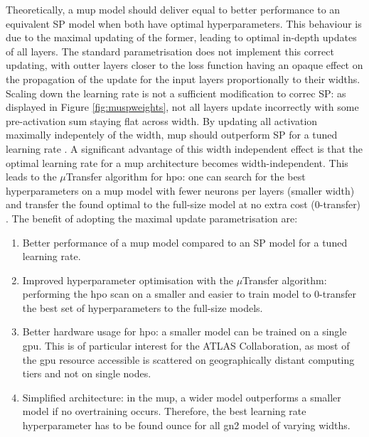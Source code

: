 Theoretically, a \gls{mup} model should deliver equal to better performance to an equivalent SP model when both have optimal hyperparameters. This behaviour is due to the maximal updating of the former, leading to optimal in-depth updates of all layers. The standard parametrisation does not implement this correct updating, with outter layers closer to the loss function having an opaque effect on the propagation of the update for the input layers proportionally to their widths. Scaling down the learning rate is not a sufficient modification to correc SP: as displayed in Figure \ref{fig:muspweights}, not all layers update incorrectly with some pre-activation sum staying flat across width. By updating all activation maximally indepentely of the width, \gls{mup} should outperform SP for a tuned learning rate \cite{pmlr-v139-yang21c}. A significant advantage of this width independent effect is that the optimal learning rate for a \gls{mup} architecture becomes width-independent. This leads to the $\mu$Transfer algorithm for \gls{hpo}: one can search for the best hyperparameters on a \gls{mup} model with fewer neurons per layers (smaller width) and transfer the found optimal to the full-size model at no extra cost (0-transfer) \cite{yang2021tuning}. The benefit of adopting the maximal update parametrisation are:
\begin{enumerate}
  \item Better performance of a \gls{mup} model compared to an SP model for a tuned learning rate.
  \item Improved hyperparameter optimisation with the $\mu$Transfer algorithm: performing the \gls{hpo} scan on a smaller and easier to train model to 0-transfer the best set of hyperparameters to the full-size models. 
  \item Better hardware usage for \gls{hpo}: a smaller model can be trained on a single \gls{gpu}. This is of particular interest for the ATLAS Collaboration, as most of the \gls{gpu} resource accessible is scattered on geographically distant computing tiers and not on single nodes.  
  \item Simplified architecture: in the \gls{mup}, a wider model outperforms a smaller model if no overtraining occurs. Therefore, the best learning rate hyperparameter has to be found ounce for all \gls{gn2} model of varying widths.  
\end{enumerate}

